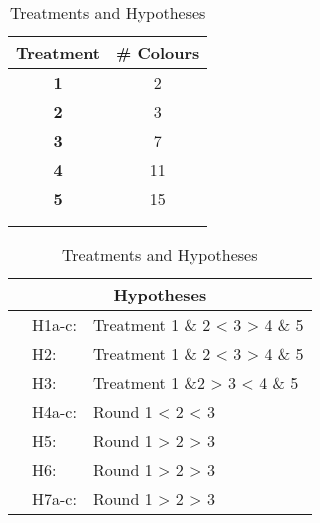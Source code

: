 \begin{table}[htbp] %
  \centering
  \caption{Treatments and Hypotheses}
  \label{tab:Hypotheses}
    \begin{tabular}{cc}
    \toprule
    \textbf{Treatment} & \textbf{\# Colours}\\
    \midrule
    \textbf{1} & 2  \\
    \textbf{2} & 3  \\
    \textbf{3} & 7  \\
    \textbf{4} & 11 \\
    \textbf{5} &  15\\
    \\
    \\
    \bottomrule
    \end{tabular}%
    \quad
    \begin{tabular}{rrr}
    \toprule
    \multicolumn{3}{c}{\textbf{Hypotheses}} \\
    \midrule
    & \multicolumn{1}{l}{H1a-c: } & \multicolumn{1}{l}{Treatment 1 \& 2 < 3 > 4 \& 5} \\
    & \multicolumn{1}{l}{H2: } & \multicolumn{1}{l}{Treatment 1 \& 2 < 3 > 4 \& 5} \\
    &  \multicolumn{1}{l}{H3: } & \multicolumn{1}{l}{Treatment 1 \&2 > 3 < 4 \& 5} \\
    &  \multicolumn{1}{l}{H4a-c: } & \multicolumn{1}{l}{Round 1 < 2 < 3} \\
    &  \multicolumn{1}{l}{H5: } & \multicolumn{1}{l}{Round 1 > 2 > 3} \\
    &  \multicolumn{1}{l}{H6: } & \multicolumn{1}{l}{Round 1 > 2 > 3} \\
    &  \multicolumn{1}{l}{H7a-c: } & \multicolumn{1}{l}{Round 1 > 2 > 3} \\
    \bottomrule
    \end{tabular}%
\end{table}%
%
%
%
%
